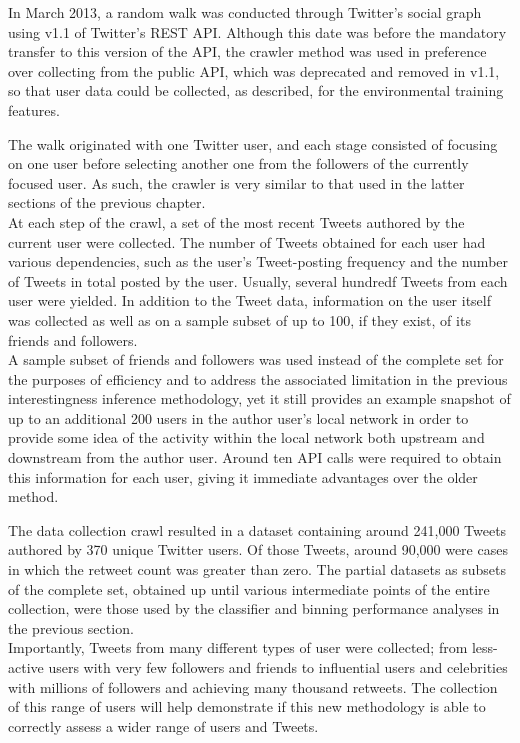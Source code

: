 In March 2013, a random walk was conducted through Twitter's social graph using v1.1 of Twitter's REST API. Although this date was before the mandatory transfer to this version of the API, the crawler method was used in preference over collecting from the public API, which was deprecated and removed in v1.1, so that user data could be collected, as described, for the environmental training features.

The walk originated with one Twitter user, and each stage consisted of focusing on one user before selecting another one from the followers of the currently focused user. As such, the crawler is very similar to that used in the latter sections of the previous chapter.\\
At each step of the crawl, a set of the most recent Tweets authored by the current user were collected. The number of Tweets obtained for each user had various dependencies, such as the user's Tweet-posting frequency and the number of Tweets in total posted by the user. Usually, several hundredf Tweets from each user were yielded. In addition to the Tweet data, information on the user itself was collected as well as on a sample subset of up to 100, if they exist, of its friends and followers.\\
A sample subset of friends and followers was used instead of the complete set for the purposes of efficiency and to address the associated limitation in the previous interestingness inference methodology, yet it still provides an example snapshot of up to an additional 200 users in the author user's local network in order to provide some idea of the activity within the local network both upstream and downstream from the author user. Around ten API calls were required to obtain this information for each user, giving it immediate advantages over the older method. 

The data collection crawl resulted in a dataset containing around 241,000 Tweets authored by 370 unique Twitter users. Of those Tweets, around 90,000 were cases in which the retweet count was greater than zero. The partial datasets as subsets of the complete set, obtained up until various intermediate points of the entire collection, were those used by the classifier and binning performance analyses in the previous section.\\
Importantly, Tweets from many different types of user were collected; from less-active users with very few followers and friends to influential users and celebrities with millions of followers and achieving many thousand retweets. The collection of this range of users will help demonstrate if this new methodology is able to correctly assess a wider range of users and Tweets.


